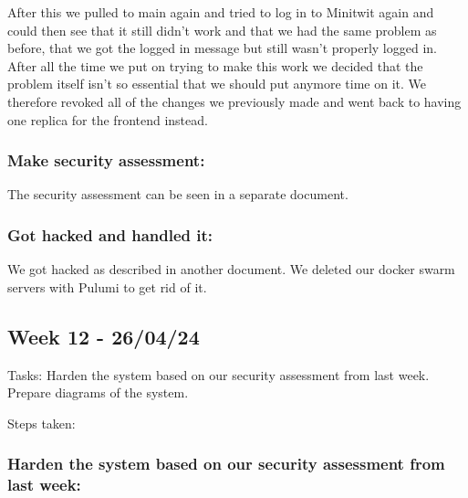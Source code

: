 After this we pulled to main again and tried to log in to Minitwit again and could then see that it still didn't work and that we had the same problem as before, that we got the logged in message but still wasn't properly logged in. After all the time we put on trying to make this work we decided that the problem itself isn't so essential that we should put anymore time on it. We therefore revoked all of the changes we previously made and went back to having one replica for the frontend instead.

\subsubsection{Make security assessment:}
\label{log:make-security-assessment}

The security assessment can be seen in a separate document.

\subsubsection{Got hacked and handled it:}
\label{log:got-hacked-and-handled-it}

We got hacked as described in another document. We deleted our docker
swarm servers with Pulumi to get rid of it.

\subsection{Week 12 - 26/04/24}
\label{week12}

Tasks: Harden the system based on our security assessment from last week. Prepare diagrams of the system.

Steps taken:

\subsubsection{Harden the system based on our security assessment from last week:}
\label{log:harden-the-system-based-on-our-security-assessment-from-last-week}

